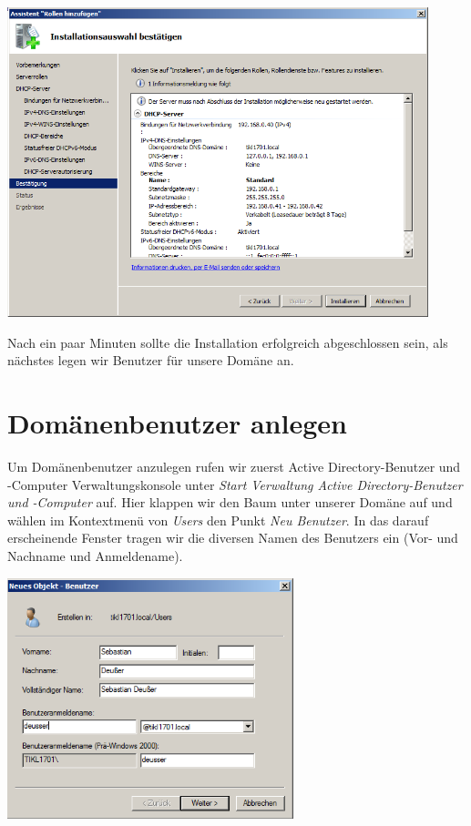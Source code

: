 \documentclass[12pt,a4paper,titlepage]{scrartcl} %
\begin{document}
	\begin{center}\includegraphics[height=9cm]{Bilder/048(DHCP10)}\\ \end{center}
	
Nach ein paar Minuten sollte die Installation erfolgreich abgeschlossen sein, als nächstes legen wir Benutzer für unsere Domäne an.

\newpage
\section{Domänenbenutzer anlegen}
Um Domänenbenutzer anzulegen rufen wir zuerst Active Directory-Benutzer und -Computer Verwaltungskonsole unter \emph{Start  Verwaltung  Active Directory-Benutzer und -Computer} auf. Hier klappen wir den Baum unter unserer Domäne auf und wählen im Kontextmenü von \emph{Users} den Punkt \emph{Neu  Benutzer}. In das darauf erscheinende Fenster tragen wir die diversen Namen des Benutzers ein (Vor- und Nachname und Anmeldename).\\

	\begin{center}\includegraphics[height=7cm]{Bilder/050}\\ \end{center}
	
\end{document}
